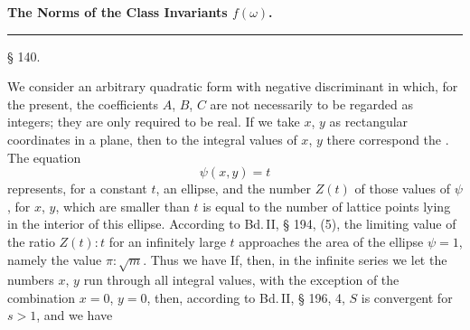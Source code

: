 
\begin{center}

\textbf{The Norms of the Class Invariants $f(\omega)$.}

\rule{0.3\linewidth}{0.4pt}
\end{center}

\begin{center}
§ 140. 
\end{center}

We consider an arbitrary quadratic form
with negative discriminant
in which, for the present, the coefficients $A$, $B$, $C$ are not necessarily to be regarded as integers; they are only required to be real. If we take $x$, $y$ as rectangular coordinates in a plane, then to the integral values of $x$, $y$ there correspond the . The equation
\[\psi(x,y) = t\]
represents, for a constant $t$, an ellipse, and the number $Z(t)$ of those values of $\psi$, for  $x$, $y$, which are smaller than $t$ is equal to the number of lattice points lying in the interior of this ellipse. According to Bd.\,II, § 194, (5), the limiting value of the ratio $Z(t):t$ for an infinitely large $t$ approaches the area of the ellipse $\psi = 1$, namely the value $\pi:\sqrt{m}$. Thus we have
If, then, in the infinite series
we let the numbers $x$, $y$ run through all integral values, with the exception of the combination $x=0$, $y=0$, then, according to Bd.\,II, § 196, 4, $S$ is convergent for $s>1$, and we have
